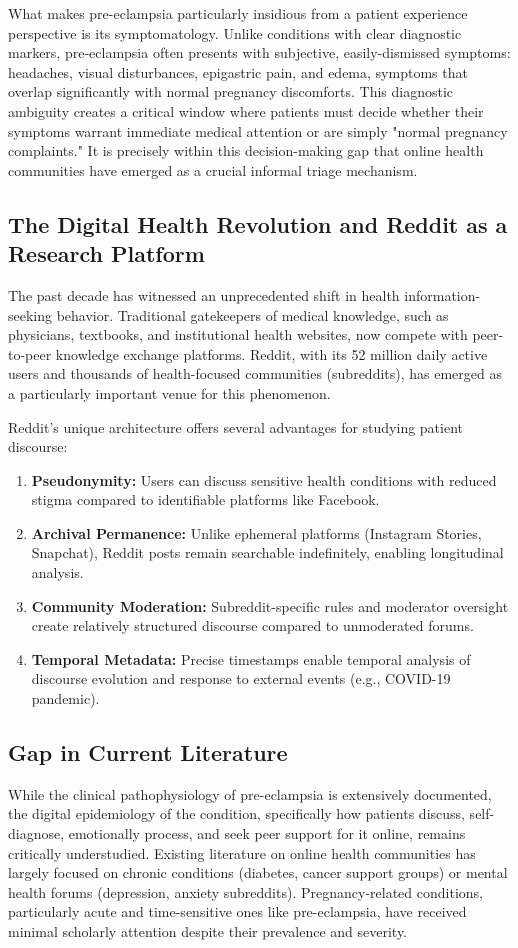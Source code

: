 \documentclass[12pt, a4paper]{article}
\begin{document}
What makes pre-eclampsia particularly insidious from a patient experience perspective is its symptomatology. Unlike conditions with clear diagnostic markers, pre-eclampsia often presents with subjective, easily-dismissed symptoms: headaches, visual disturbances, epigastric pain, and edema, symptoms that overlap significantly with normal pregnancy discomforts. This diagnostic ambiguity creates a critical window where patients must decide whether their symptoms warrant immediate medical attention or are simply "normal pregnancy complaints." It is precisely within this decision-making gap that online health communities have emerged as a crucial informal triage mechanism.

\subsection{The Digital Health Revolution and Reddit as a Research Platform}
The past decade has witnessed an unprecedented shift in health information-seeking behavior. Traditional gatekeepers of medical knowledge, such as physicians, textbooks, and institutional health websites, now compete with peer-to-peer knowledge exchange platforms. Reddit, with its 52 million daily active users and thousands of health-focused communities (subreddits), has emerged as a particularly important venue for this phenomenon.

Reddit's unique architecture offers several advantages for studying patient discourse:
\begin{enumerate}
    \item \textbf{Pseudonymity:} Users can discuss sensitive health conditions with reduced stigma compared to identifiable platforms like Facebook.
    \item \textbf{Archival Permanence:} Unlike ephemeral platforms (Instagram Stories, Snapchat), Reddit posts remain searchable indefinitely, enabling longitudinal analysis.
    \item \textbf{Community Moderation:} Subreddit-specific rules and moderator oversight create relatively structured discourse compared to unmoderated forums.
    \item \textbf{Temporal Metadata:} Precise timestamps enable temporal analysis of discourse evolution and response to external events (e.g., COVID-19 pandemic).
\end{enumerate}

\subsection{Gap in Current Literature}
While the clinical pathophysiology of pre-eclampsia is extensively documented, the digital epidemiology of the condition, specifically how patients discuss, self-diagnose, emotionally process, and seek peer support for it online, remains critically understudied. Existing literature on online health communities has largely focused on chronic conditions (diabetes, cancer support groups) or mental health forums (depression, anxiety subreddits). Pregnancy-related conditions, particularly acute and time-sensitive ones like pre-eclampsia, have received minimal scholarly attention despite their prevalence and severity.
\end{document}
